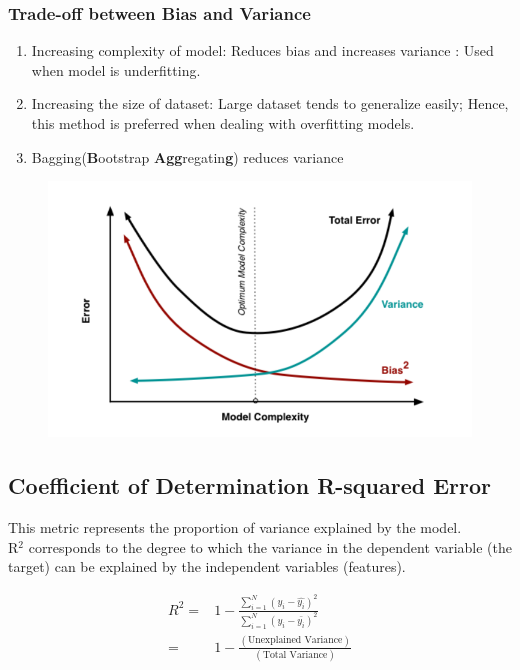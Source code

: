\documentclass[12pt,letterpaper, onecolumn]{exam}
\begin{document}
 \subsubsection*{Trade-off between Bias and Variance}
 \begin{enumerate}
 \item Increasing complexity of model: Reduces bias and increases variance : Used when model is underfitting.
 \item Increasing the size of dataset: Large dataset tends to generalize easily; Hence, this method is preferred when dealing with overfitting models.
 \item Bagging(\textbf{B}ootstrap \textbf{Agg}regatin\textbf{g}) reduces variance
 \end{enumerate}
 
 \begin{figure}[!h]
 \includegraphics{Bias_Variance_1.png}
 \end{figure}
 
 \subsection*{Coefficient of Determination R-squared Error}
 This metric represents the proportion of variance explained by the model.\\
 R$^{2}$ corresponds to the degree to which the variance in the dependent variable (the target) can be explained by the independent variables (features).
 
 \begin{align*}
 R^2 = {}& 1- \frac{\sum_{i=1}^N(y_i-\hat{y_i})^2}{\sum_{i=1}^N(y_i-\bar{y_i})^2}\\
 ={}& 1 - \frac{(\text{Unexplained Variance})}{(\text{Total Variance})}
 \end{align*}
 
\end{document}
